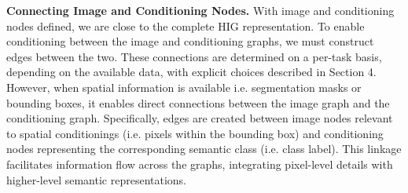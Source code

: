 
\textbf{Connecting Image and Conditioning Nodes.} With image and conditioning nodes defined, we are close to the complete HIG representation. To enable conditioning between the image and conditioning graphs, we must construct edges between the two. These connections are determined on a per-task basis, depending on the available data, with explicit choices described in Section 4. However, when spatial information is available i.e. segmentation masks or bounding boxes, it enables direct connections between the image graph and the conditioning graph. Specifically, edges are created between image nodes relevant to spatial conditionings (i.e. pixels within the bounding box) and conditioning nodes representing the corresponding semantic class (i.e. class label). This linkage facilitates information flow across the graphs, integrating pixel-level details with higher-level semantic representations. 

